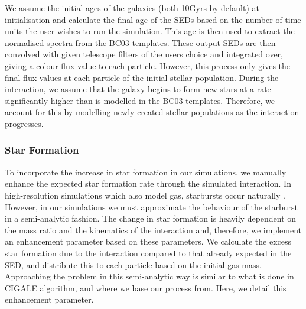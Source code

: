 We assume the initial ages of the galaxies (both 10Gyrs by default) at initialisation and calculate the final age of the SEDs based on the number of time units the user wishes to run the simulation. This age is then used to extract the normalised spectra from the BC03 templates. These output SEDs are then convolved with given telescope filters of the users choice and integrated over, giving a colour flux value to each particle. However, this process only gives the final flux values at each particle of the initial stellar population. During the interaction, we assume that the galaxy begins to form new stars at a rate significantly higher than is modelled in the BC03 templates. Therefore, we account for this by modelling newly created stellar populations as the interaction progresses.

\subsubsection{Star Formation}\label{SFR_in_Model}
To incorporate the increase in star formation in our simulations, we manually enhance the expected star formation rate through the simulated interaction. In 
high-resolution simulations which also model gas, starbursts occur naturally \citep{2009PASJ...61..481S}. However, in our simulations we must approximate the behaviour of the starburst in a semi-analytic fashion. The change in star formation is heavily dependent on the mass ratio and the kinematics of the interaction and, therefore, we implement an enhancement parameter based on these parameters. We calculate the excess star formation due to the interaction compared to that already expected in the SED, and distribute this to each particle based on the initial gas mass. Approaching the problem in this semi-analytic way is similar to what is done in CIGALE \citep{2019A&A...622A.103B} algorithm, and where we base our process from. Here, we detail this enhancement parameter.

